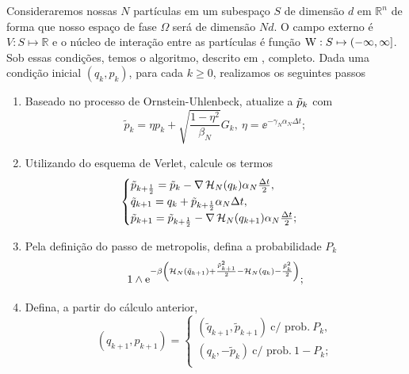 \documentclass[12pt]{report}
\begin{document}
Consideraremos nossas $N$ partículas em um subespaço $S$ de dimensão $d$ em $\mathbb{R}^n$ de forma que nosso espaço de fase $\Omega$ será de dimensão $Nd$. O campo externo é $V : S \mapsto \mathbb{R}$ e o núcleo de interação entre as partículas é função $\operatorname{W} : S \mapsto (-\infty, \infty]$. Sob essas condições, temos o algoritmo, descrito em \cite{Chafa2018}, completo. Dada uma condição inicial $(q_k, p_k)$, para cada $k\geq0$, realizamos os seguintes passos
\begin{enumerate}
	\item Baseado no processo de Ornstein-Uhlenbeck, atualize a $\tilde{p}_k$ com
	\begin{equation}
		\tilde{p}_k = \eta p_k + \sqrt{\frac{1-\eta^2}{\beta_N}} G_k, \ \eta = \ee^{-\gamma_N \alpha_N \Delta t};
		\label{Equation: Alg Mehler}
	\end{equation}
	\item Utilizando do esquema de Verlet, calcule os termos
	\begin{equation}
		\begin{cases}
			\tilde{p}_{k+\frac{1}{2}} = \tilde{p}_k - \nabla \operatorname{\mathcal{H}}_N(q_k) \alpha_N \frac{\Delta t}{2}, \\
			\tilde{q}_{k+1} = q_k + \tilde{p}_{k + \frac{1}{2}} \alpha_N \Delta t, \\
			\tilde{p}_{k+1} = \tilde{p}_{k+\frac{1}{2}} - \nabla \operatorname{\mathcal{H}}_N(q_{k+1}) \alpha_N \frac{\Delta t}{2};
			\label{Equation: Alg Verlet}
		\end{cases}
	\end{equation}
	\item Pela definição do passo de metropolis, defina a probabilidade $P_k$
	\begin{equation}
		1 \wedge \operatorname{\rm e}^{ -\beta \left( \operatorname{\mathcal{H}}_N(\tilde{q}_{k+1}) + \frac{\tilde{p}^2_{k+1}}{2} - \operatorname{\mathcal{H}}_N(q_k) - \frac{\tilde{p}^2_k}{2} \right) };
		\label{Equação: Alg Pk}
	\end{equation}
	\item Defina, a partir do cálculo anterior, 
	\begin{equation}
		(q_{k+1}, p_{k+1}) = 
		\begin{cases}
			(\tilde{q}_{k+1}, \tilde{p}_{k+1}) \ \text{c/ prob.} \ P_k, \\
			(q_k, -\tilde{p}_{k}) \ \text{c/ prob.} \ 1-P_k; \\
		\end{cases}
		\label{Equation: Alg Metro}
	\end{equation}
\end{enumerate}
\end{document}
